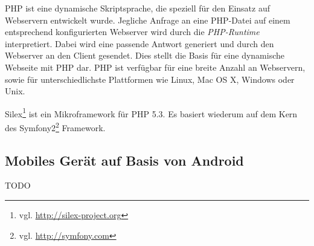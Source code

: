 PHP ist eine dynamische Skriptsprache, die speziell für den Einsatz auf Webservern entwickelt wurde. Jegliche Anfrage an eine PHP-Datei auf einem entsprechend konfigurierten Webserver wird durch die \emph{PHP-Runtime} interpretiert. Dabei wird eine passende Antwort generiert und durch den Webserver an den Client gesendet. Dies stellt die Basis für eine dynamische Webseite mit PHP dar. PHP ist verfügbar für eine breite Anzahl an Webservern, sowie für unterschiedlichste Plattformen wie Linux, Mac OS X, Windows oder Unix.

Silex\footnote{vgl. \url{http://silex-project.org}} ist ein Mikroframework für PHP 5.3. Es basiert wiederum auf dem Kern des Symfony2\footnote{vgl. \url{http://symfony.com}} Framework.

\subsection{Mobiles Gerät auf Basis von Android}

TODO